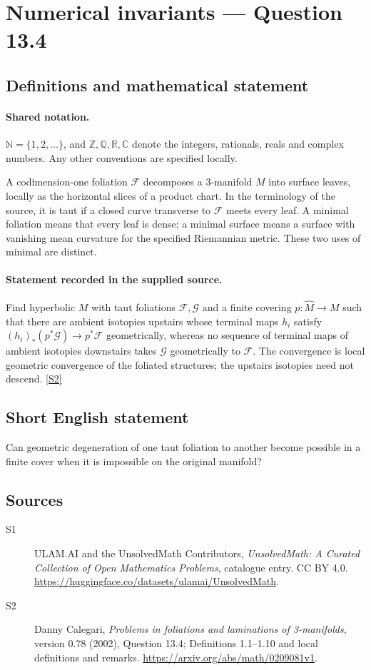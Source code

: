 \documentclass[11pt]{article}
\newcommand{\sref}[2]{\hyperlink{source:#1:#2}{[S#2]}}
\begin{document}
\section{Numerical invariants — Question 13.4}\label{statement}

\subsection{Definitions and mathematical statement}

\paragraph{Shared notation.}$\mathbb N=\{1,2,\ldots\}$, and $\mathbb Z,\mathbb Q,\mathbb R,\mathbb C$ denote the integers, rationals, reals and complex numbers. Any other conventions are specified locally.


A codimension-one foliation $\mathcal F$ decomposes a $3$-manifold $M$ into surface leaves, locally as the horizontal slices of a product chart. In the terminology of the source, it is taut if a closed curve transverse to $\mathcal F$ meets every leaf. A minimal foliation means that every leaf is dense; a minimal surface means a surface with vanishing mean curvature for the specified Riemannian metric. These two uses of minimal are distinct.
\paragraph{Statement recorded in the supplied source.}
Find hyperbolic $M$ with taut foliations $\mathcal F,\mathcal G$ and a finite covering $p:\widehat M\to M$ such that there are ambient isotopies upstairs whose terminal maps $h_i$ satisfy $(h_i)_*(p^*\mathcal G)\to p^*\mathcal F$ geometrically, whereas no sequence of terminal maps of ambient isotopies downstairs takes $\mathcal G$ geometrically to $\mathcal F$. The convergence is local geometric convergence of the foliated structures; the upstairs isotopies need not descend. \sref{statement}{2}
\subsection{Short English statement}
Can geometric degeneration of one taut foliation to another become possible in a finite cover when it is impossible on the original manifold?
\subsection{Sources}
\begin{description}
\item[\hypertarget{source:statement:1}{S1}] ULAM.AI and the UnsolvedMath Contributors, \emph{UnsolvedMath: A Curated Collection of Open Mathematics Problems}, catalogue entry. CC BY 4.0. \url{https://huggingface.co/datasets/ulamai/UnsolvedMath}.
\item[\hypertarget{source:statement:2}{S2}] Danny Calegari, \emph{Problems in foliations and laminations of 3-manifolds}, version 0.78 (2002), Question 13.4; Definitions 1.1--1.10 and local definitions and remarks. \url{https://arxiv.org/abs/math/0209081v1}.
\end{description}
\label{end:statement}
\end{document}
